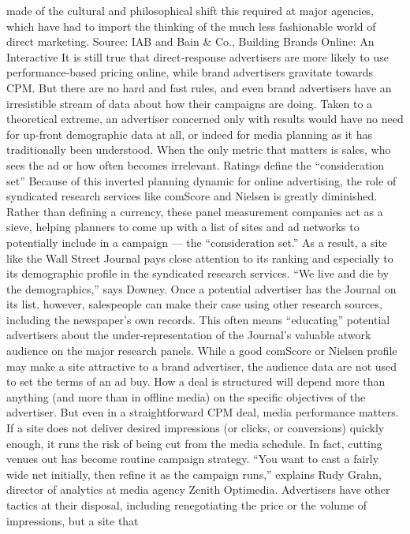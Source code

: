 made of the cultural and philosophical shift this required at major
agencies, which have had to import the thinking of the much less
fashionable world of direct marketing.
Source: IAB and Bain & Co., Building Brands Online: An Interactive
It is still true that direct‐response advertisers are more likely to use
performance‐based pricing online, while brand advertisers gravitate
towards CPM. But there are no hard and fast rules, and even brand
advertisers have an irresistible stream of data about how their campaigns
are doing. Taken to a theoretical extreme, an advertiser concerned only
with results would have no need for up‐front demographic data at all, or
indeed for media planning as it has traditionally been understood. When
the only metric that matters is sales, who sees the ad or how often
becomes irrelevant.
Ratings define the ``consideration set''
Because of this inverted planning dynamic for online advertising, the role
of syndicated research services like comScore and Nielsen is greatly
diminished. Rather than defining a currency, these panel measurement
companies act as a sieve, helping planners to come up with a list of sites
and ad networks to potentially include in a campaign — the
``consideration set.''
As a result, a site like the Wall Street Journal pays close attention to its
ranking and especially to its demographic profile in the syndicated
research services. ``We live and die by the demographics,'' says Downey.
Once a potential advertiser has the Journal on its list, however, salespeople
can make their case using other research sources, including the
newspaper’s own records. This often means ``educating'' potential
advertisers about the under‐representation of the Journal’s valuable atwork
audience on the major research panels.
While a good comScore or Nielsen profile may make a site attractive to a
brand advertiser, the audience data are not used to set the terms of an ad
buy. How a deal is structured will depend more than anything (and more
than in offline media) on the specific objectives of the advertiser. But even
in a straightforward CPM deal, media performance matters. If a site does
not deliver desired impressions (or clicks, or conversions) quickly enough,
it runs the risk of being cut from the media schedule.
In fact, cutting venues out has become routine campaign strategy. ``You
want to cast a fairly wide net initially, then refine it as the campaign
runs,'' explains Rudy Grahn, director of analytics at media agency Zenith
Optimedia. Advertisers have other tactics at their disposal, including
renegotiating the price or the volume of impressions, but a site that
